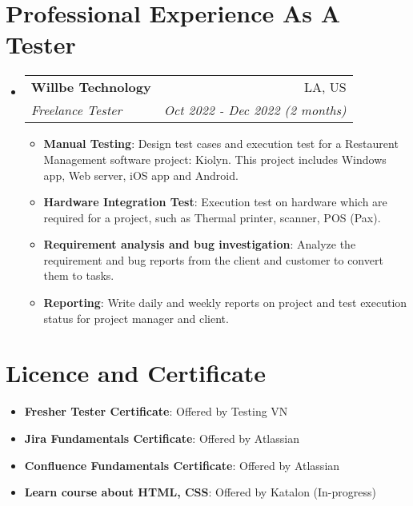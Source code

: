 \documentclass[letterpaper,11pt]{article}
\makeatletter
\newcommand{\resumeItem}[2]{
  \item\small{
    \textbf{#1}{: #2 \vspace{-2pt}}
  }
}
\newcommand{\resumeSubheading}[4]{
  \vspace{-1pt}\item
    \begin{tabular*}{0.97\textwidth}[t]{l@{\extracolsep{\fill}}r}
      \textbf{#1} & #2 \\
      \textit{\small#3} & \textit{\small #4} \\
    \end{tabular*}\vspace{-5pt}
}
\newcommand{\resumeSubItem}[2]{\resumeItem{#1}{#2}\vspace{-4pt}}
\newcommand{\resumeSubHeadingListStart}{\begin{itemize}[leftmargin=*]}
\newcommand{\resumeSubHeadingListEnd}{\end{itemize}}
\newcommand{\resumeItemListStart}{\begin{itemize}}
\newcommand{\resumeItemListEnd}{\end{itemize}\vspace{-5pt}}
\makeatother
\begin{document}
\section{Professional Experience As A Tester}
  \resumeSubHeadingListStart
    \resumeSubheading
      {Willbe Technology}{LA, US}
      {Freelance Tester}{Oct 2022 - Dec 2022 (2 months)}
      \resumeItemListStart
        \resumeItem{Manual Testing}
          {Design test cases and execution test for a Restaurent Management software project: Kiolyn. This project includes Windows app, Web server, iOS app and Android.}
        \resumeItem{Hardware Integration Test}
          {Execution test on hardware which are required for a project, such as Thermal printer, scanner, POS (Pax).}
        \resumeItem{Requirement analysis and bug investigation}
          {Analyze the requirement and bug reports from the client and customer to convert them to tasks.}
        \resumeItem{Reporting}
          {Write daily and weekly reports on project and test execution status for project manager and client.}
      \resumeItemListEnd
  \resumeSubHeadingListEnd



\section{Licence and Certificate}
  \resumeSubHeadingListStart
    \resumeSubItem{Fresher Tester Certificate}
      {Offered by Testing VN}
    \resumeSubItem{Jira Fundamentals Certificate}
    {Offered by Atlassian}
    \resumeSubItem{Confluence Fundamentals Certificate}
    {Offered by Atlassian}
    \resumeSubItem{Learn course about HTML, CSS}
    {Offered by Katalon (In-progress)}
  \resumeSubHeadingListEnd
\end{document}
